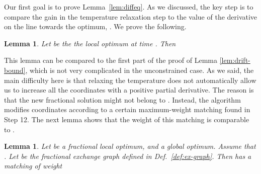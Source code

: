 \documentclass{article}[11pt]
\newtheorem{lemma}[theorem]{Lemma}
\begin{document}
Our first goal is to prove Lemma~\ref{lem:diffeq}. As we discussed,
the key step is to compare the gain in the temperature relaxation step
to the value of the derivative on the line towards the optimum,
.
We prove the following.

\begin{lemma}
\label{lem:temp-gain}
Let  be the the local optimum at time . Then

\end{lemma}

This lemma can be compared to the first part of the proof of Lemma \ref{lem:drift-bound},
which is not very complicated in the unconstrained case. As we said, the main difficulty here
is that relaxing the temperature does not automatically allow us to increase
all the coordinates with a positive partial derivative.
The reason is that the new fractional solution might not belong to .
Instead, the algorithm modifies coordinates according to a certain maximum-weight matching
found in Step 12. The next lemma shows that the weight of this matching
is comparable to .

\begin{lemma}
\label{lem:matching}
Let 
be a fractional local optimum, and  a global optimum.
Assume that . Let  be the fractional exchange graph
defined in Def.~\ref{def:ex-graph}.
Then  has a matching  of weight

\end{lemma}
\end{document}

